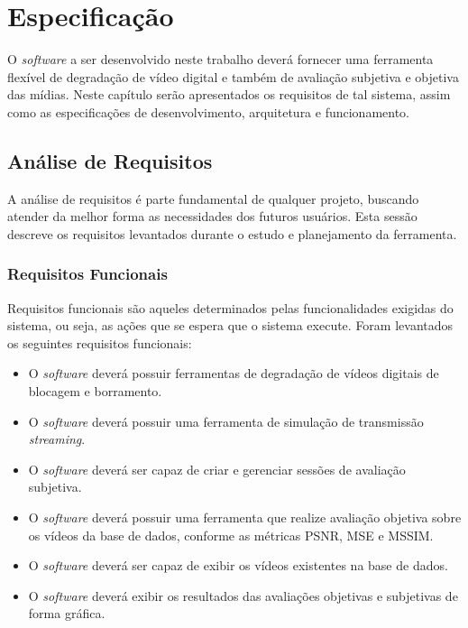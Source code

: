 
\chapter{Especificação} %

O \emph{software} a ser desenvolvido neste trabalho deverá fornecer uma ferramenta flexível de degradação de vídeo digital e também de avaliação subjetiva e objetiva das mídias.
Neste capítulo serão apresentados os requisitos de tal sistema, assim como as especificações de desenvolvimento, arquitetura e funcionamento.

\section{Análise de Requisitos}

A análise de requisitos é parte fundamental de qualquer projeto, buscando atender da melhor forma as necessidades dos futuros usuários.
Esta sessão descreve os requisitos levantados durante o estudo e planejamento da ferramenta.

\subsection{Requisitos Funcionais}

Requisitos funcionais são aqueles determinados pelas funcionalidades exigidas do sistema, ou seja, as ações que se espera que o sistema execute. 
Foram levantados os seguintes requisitos funcionais:

\begin{itemize}
	\item O \emph{software} deverá possuir ferramentas de degradação de vídeos digitais de blocagem e borramento.
	\item O \emph{software} deverá possuir uma ferramenta de simulação de transmissão \emph{streaming}.
	\item O \emph{software} deverá ser capaz de criar e gerenciar sessões de avaliação subjetiva.
	\item O \emph{software} deverá possuir uma ferramenta que realize avaliação objetiva sobre os vídeos da base de dados, conforme as métricas PSNR, MSE e MSSIM.
	\item O \emph{software} deverá ser capaz de exibir os vídeos existentes na base de dados.
	\item O \emph{software} deverá exibir os resultados das avaliações objetivas e subjetivas de forma gráfica.
\end{itemize}

